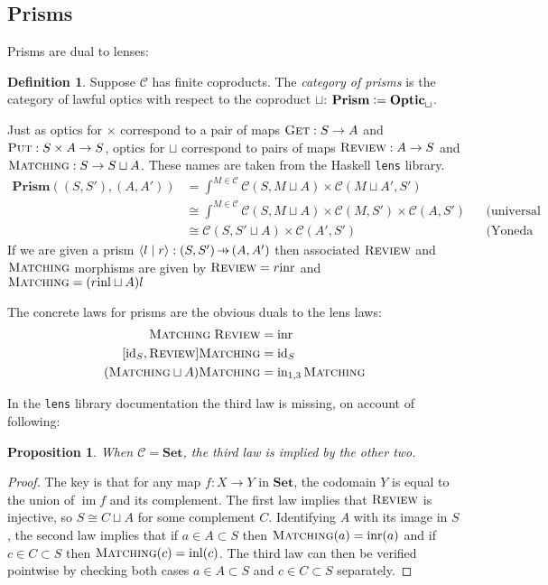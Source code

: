 \documentclass[11pt,letterpaper]{article}
\theoremstyle{plain}
\newtheorem{proposition}[theorem]{Proposition}
\theoremstyle{definition}
\newtheorem{definition}[theorem]{Definition}
\newcommand{\C}{\mathscr{C}}
\newcommand{\lenslib}{\texttt{lens}}
\newcommand{\Set}{\mathbf{Set}}
\newcommand{\Optic}{\mathbf{Optic}}
\newcommand{\Prism}{\mathbf{Prism}}
\newcommand{\id}{\mathrm{id}}
\newcommand{\inl}{\mathrm{inl}}
\newcommand{\inr}{\mathrm{inr}}
\DeclareMathOperator{\im}{im}
\newcommand{\defeq}{\mathrel{\vcentcolon=}}
\newcommand{\rep}[2]{{\ensuremath \left\langle #1 \mid #2 \right\rangle}}
\newcommand{\fget}{\textsc{Get}}
\newcommand{\fput}{\textsc{Put}}
\newcommand{\freview}{\textsc{Review}}
\newcommand{\fmatching}{\textsc{Matching}}
\newcommand{\hto}{\ensuremath{\,\mathaccent\shortmid\rightarrow\,}}
\begin{document}
\subsection{Prisms}
Prisms are dual to lenses:

\begin{definition}
  Suppose $\C$ has finite coproducts. The \emph{category of prisms} is the category of lawful optics with respect to the coproduct $\sqcup$: $\Prism \defeq \Optic_\sqcup$.
\end{definition}

Just as optics for $\times$ correspond to a pair of maps $\fget : S \to A$ and $\fput : S \times A \to S$, optics for $\sqcup$ correspond to pairs of maps $\freview : A \to S$ and $\fmatching : S \to S \sqcup A$. These names are taken from the Haskell \lenslib{} library.
\begin{align*}
  \Prism((S, S'), (A, A')) &= \int^{M \in \C} \C(S, M \sqcup A) \times \C(M \sqcup A', S') \\
                                  &\cong \int^{M \in \C} \C(S, M \sqcup A) \times \C(M, S') \times \C(A, S') && \text{(universal property of coproduct)} \\
                                  &\cong \C(S, S' \sqcup A) \times \C(A', S') && \text{(Yoneda reduction)}
\end{align*}
If we are given a prism $\rep{l}{r} : (S, S') \hto (A, A')$ then associated $\freview$ and $\fmatching$ morphisms are given by $\freview = r \inr$ and $\fmatching = (r\inl \sqcup A)l$

The concrete laws for prisms are the obvious duals to the lens laws:
\begin{align*}
  \fmatching \; \freview &= \inr \\
  [\id_S, \freview] \fmatching &= \id_S \\
  (\fmatching \sqcup A) \fmatching &= \mathrm{in}_{1,3} \, \fmatching
\end{align*}

In the \lenslib{} library documentation the third law is missing, on account of following:

\begin{proposition}
  When $\C = \Set$, the third law is implied by the other two.
\end{proposition}
\begin{proof}
  The key is that for any map $f : X \to Y$ in $\Set$, the codomain $Y$ is equal to the union of $\im f$ and its complement. The first law implies that $\freview$ is injective, so $S \cong C \sqcup A$ for some complement $C$. Identifying $A$ with its image in $S$, the second law implies that if $a\in A \subset S$ then $\fmatching(a) = \inr(a)$ and if $c\in C \subset S$ then $\fmatching(c) = \inl(c)$. The third law can then be verified pointwise by checking both cases $a\in A \subset S$ and $c\in C \subset S$ separately.
\end{proof}
\end{document}
